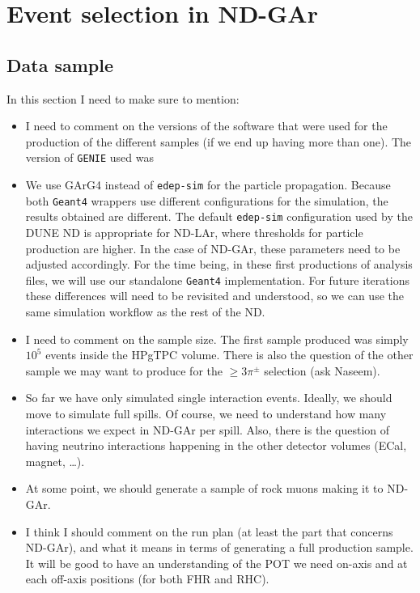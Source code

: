 \chapter{Event selection in ND-GAr}
\label{chapter:gar_selection}

\section{Data sample}

{\color{red}
In this section I need to make sure to mention:
\begin{itemize}
    \item I need to comment on the versions of the software that were used for the production of the different samples (if we end up having more than one). The version of \texttt{GENIE} used was 
    \item We use GArG4 instead of \texttt{edep-sim} for the particle propagation. Because both \texttt{Geant4} wrappers use different configurations for the simulation, the results obtained are different. The default \texttt{edep-sim} configuration used by the DUNE ND is appropriate for ND-LAr, where thresholds for particle production are higher. In the case of ND-GAr, these parameters need to be adjusted accordingly. For the time being, in these first productions of analysis files, we will use our standalone \texttt{Geant4} implementation. For future iterations these differences will need to be revisited and understood, so we can use the same simulation workflow as the rest of the ND.
    \item I need to comment on the sample size. The first sample produced was simply $10^{5}$ events inside the HPgTPC volume. There is also the question of the other sample we may want to produce for the $\geq 3\pi^{\pm}$ selection (ask Naseem).
    \item So far we have only simulated single interaction events. Ideally, we should move to simulate full spills. Of course, we need to understand how many interactions we expect in ND-GAr per spill. Also, there is the question of having neutrino interactions happening in the other detector volumes (ECal, magnet, \dots).
    \item At some point, we should generate a sample of rock muons making it to ND-GAr.
    \item I think I should comment on the run plan (at least the part that concerns ND-GAr), and what it means in terms of generating a full production sample. It will be good to have an understanding of the POT we need on-axis and at each off-axis positions (for both FHR and RHC).
\end{itemize}
}

